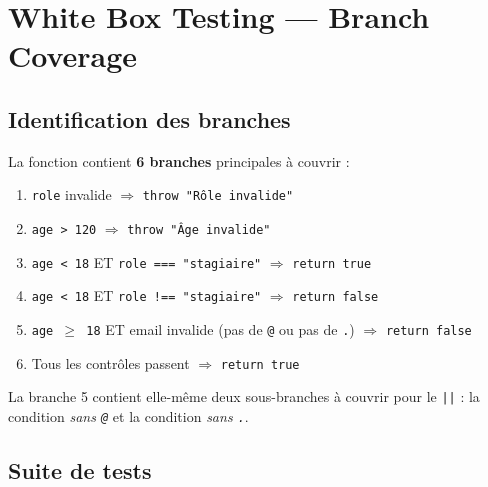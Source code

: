 \documentclass[11pt,a4paper]{article}
\begin{document}
\section{White Box Testing --- Branch Coverage}

\subsection{Identification des branches}

La fonction contient \textbf{6 branches} principales à couvrir :

\begin{enumerate}
  \item \texttt{role} invalide $\Rightarrow$ \texttt{throw "Rôle invalide"}
  \item \texttt{age > 120} $\Rightarrow$ \texttt{throw "Âge invalide"}
  \item \texttt{age < 18} ET \texttt{role === "stagiaire"} $\Rightarrow$ \texttt{return true}
  \item \texttt{age < 18} ET \texttt{role !== "stagiaire"} $\Rightarrow$ \texttt{return false}
  \item \texttt{age $\geq$ 18} ET email invalide (pas de \texttt{@} ou pas de \texttt{.}) $\Rightarrow$ \texttt{return false}
  \item Tous les contrôles passent $\Rightarrow$ \texttt{return true}
\end{enumerate}

La branche 5 contient elle-même deux sous-branches à couvrir pour le \texttt{||} :
la condition \textit{sans \texttt{@}} et la condition \textit{sans \texttt{.}}.

\subsection{Suite de tests}
\end{document}
